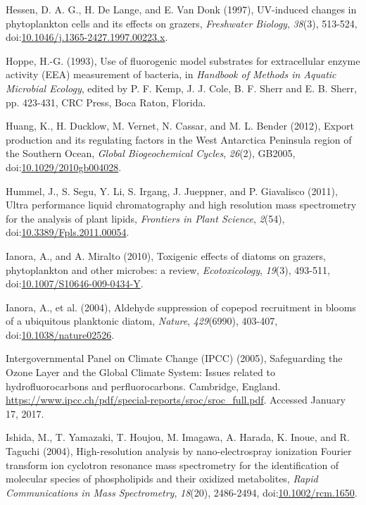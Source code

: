 \begin{singlespace}
{{Hessen, D. A. G., H. De Lange, and E. Van Donk (1997), UV-induced changes in phytoplankton cells and its effects on grazers, \emph{Freshwater Biology}, \emph{38}(3), 513-524, doi:\href{http://dx.doi.org/10.1046/j.1365-2427.1997.00223.x}{10.1046/j.1365-2427.1997.00223.x}.

Hoppe, H.-G. (1993), Use of fluorogenic model substrates for extracellular enzyme activity (EEA) measurement of bacteria, in \emph{Handbook of Methods in Aquatic Microbial Ecology}, edited by P. F. Kemp, J. J. Cole, B. F. Sherr and E. B. Sherr, pp. 423-431, CRC Press, Boca Raton, Florida.

Huang, K., H. Ducklow, M. Vernet, N. Cassar, and M. L. Bender (2012), Export production and its regulating factors in the West Antarctica Peninsula region of the Southern Ocean, \emph{Global Biogeochemical Cycles}, \emph{26}(2), GB2005, doi:\href{http://dx.doi.org/10.1029/2010gb004028}{10.1029/2010gb004028}.

Hummel, J., S. Segu, Y. Li, S. Irgang, J. Jueppner, and P. Giavalisco (2011), Ultra performance liquid chromatography and high resolution mass spectrometry for the analysis of plant lipids, \emph{Frontiers in Plant Science}, \emph{2}(54), doi:\href{http://dx.doi.org/10.3389/Fpls.2011.00054}{10.3389/Fpls.2011.00054}.

Ianora, A., and A. Miralto (2010), Toxigenic effects of diatoms on grazers, phytoplankton and other microbes: a review, \emph{Ecotoxicology}, \emph{19}(3), 493-511, doi:\href{http://dx.doi.org/10.1007/S10646-009-0434-Y}{10.1007/S10646-009-0434-Y}.

Ianora, A., et al. (2004), Aldehyde suppression of copepod recruitment in blooms of a ubiquitous planktonic diatom, \emph{Nature}, \emph{429}(6990), 403-407, doi:\href{http://dx.doi.org/10.1038/nature02526}{10.1038/nature02526}.

Intergovernmental Panel on Climate Change (IPCC) (2005), Safeguarding the Ozone Layer and the Global Climate System: Issues related to hydrofluorocarbons and perfluorocarbons. Cambridge, England. \url{https://www.ipcc.ch/pdf/special-reports/sroc/sroc_full.pdf}. Accessed January 17, 2017.

Ishida, M., T. Yamazaki, T. Houjou, M. Imagawa, A. Harada, K. Inoue, and R. Taguchi (2004), High-resolution analysis by nano-electrospray ionization Fourier transform ion cyclotron resonance mass spectrometry for the identification of molecular species of phospholipids and their oxidized metabolites, \emph{Rapid Communications in Mass Spectrometry}, \emph{18}(20), 2486-2494, doi:\href{http://dx.doi.org/10.1002/rcm.1650}{10.1002/rcm.1650}.

}}
\end{singlespace}

